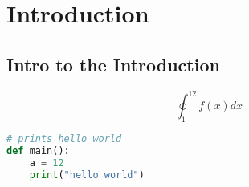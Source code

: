 \documentclass[12pt]{article}
\title{\titleVar}
\date{\today}
\author{\authorVar}
\newcommand{\tocr}{
\renewcommand\cftaftertoctitle{\par\noindent\hrulefill\par\vskip-0.65em}
\tableofcontents
\noindent\hrulefill
}
\begin{document}
    
    
\maketitle

\tocr

\thispagestyle{fancy}

\section{Introduction}
\subsection{Intro to the Introduction}
\lipsum[2]
$$ \oint _ 1 ^12 f(x) dx $$
\lipsum[4]
\begin{lstlisting}[language=Python]
# prints hello world
def main():
	a = 12
	print("hello world")
\end{lstlisting}
\lipsum[2]
\end{document}
